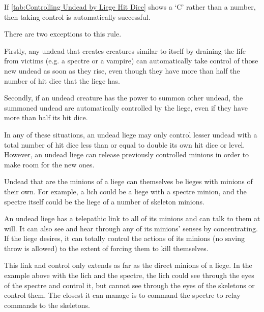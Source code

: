 \begin{multicols*}{2}
If \autoref*{tab:Controlling Undead by Liege Hit Dice} shows a ‘C’ rather than a number, then taking control is automatically successful.

There are two exceptions to this rule.

Firstly, any undead that creates creatures similar to itself by draining the life from victims (e.g. a spectre or a vampire) can automatically take control of those new undead as soon as they rise, even though they have more than half the number of hit dice that the liege has.

Secondly, if an undead creature has the power to summon other undead, the summoned undead are automatically controlled by the liege, even if they have more than half its hit dice.

In any of these situations, an undead liege may only control lesser undead with a total number of hit dice less than or equal to double its own hit dice or level. However, an undead liege can release previously controlled minions in order to make room for the new ones.

Undead that are the minions of a liege can themselves be lieges with minions of their own. For example, a lich could be a liege with a spectre minion, and the spectre itself could be the liege of a number of skeleton minions.

An undead liege has a telepathic link to all of its minions and can talk to them at will. It can also see and hear through any of its minions’ senses by concentrating. If the liege desires, it can totally control the actions of its minions (no saving throw is allowed) to the extent of forcing them to kill themselves.

This link and control only extends as far as the direct minions of a liege. In the example above with the lich and the spectre, the lich could see through the eyes of the spectre and control it, but cannot see through the eyes of the skeletons or control them. The closest it can manage is to command the spectre to relay commands to the skeletons.


\end{multicols*}
